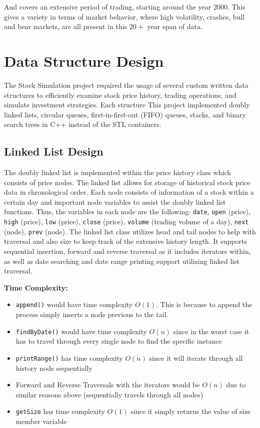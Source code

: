 \documentclass[12pt]{article}
\begin{document}
And covers an extensive period of trading, starting around the year 2000. 
This gives a variety in terms of market behavior, where high volatility, crashes, bull and bear markets, 
are all present in this $20+$ year span of data. 

\section{Data Structure Design}
The Stock Simulation project required the usage of several custom written data structures to efficiently 
examine stock price history, trading operations, and simulate investment strategies. 
Each structure This project implemented doubly linked lists, circular queues, first-in-first-out (FIFO) 
queues, stacks, and binary search trees in C++ instead of the STL containers.
\subsection{Linked List Design}
The doubly linked list is implemented within the price history class which consists of price nodes. 
The linked list allows for storage of historical stock price data in chronological order. 
Each node consists of information of a stock within a certain day and important node variables to assist 
the doubly linked list functions. Thus, the variables in each node are the following: \texttt{date}, \texttt{open} (price), 
\texttt{high} (price), \texttt{low} (price), \texttt{close} (price), \texttt{volume} (trading volume of a day), 
\texttt{next} (node), \texttt{prev} (node). 
The linked list class utilizes head and tail nodes to help with traversal and also size to keep track of 
the extensive history length. It supports sequential insertion, forward and reverse traversal as it 
includes iterators within, as well as date searching and date range printing support utilizing linked 
list traversal. 

\vspace{0.5cm}
{\large{\textbf{Time Complexity:}}}
\begin{itemize}
    \item \texttt{append()} would have time complexity $O(1)$. This is because to append the process simply inserts a node previous to the tail.
    \item \texttt{findByDate()} would have time complexity $O(n)$ since in the worst case it has to travel through every single node to find the specific instance
    \item \texttt{printRange()} has time complexity $O(n)$ since it will iterate through all history node sequentially
    \item Forward and Reverse Traversals with the iterators would be $O(n)$ due to similar reasons above (sequentially travels through all nodes)
    \item \texttt{getSize} has time complexity $O(1)$ since it simply returns the value of size member variable
\end{itemize}
\end{document}
